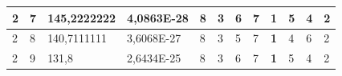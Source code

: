 \documentclass[conference]{IEEEtran}
\begin{document}
\begin{table}[]
\begin{tabular}{|llll|llllllll|}
\multicolumn{1}{|l|}{2}                                                              & \multicolumn{1}{l|}{7}                                                                 & \multicolumn{1}{l|}{145,2222222}                                                           & 4,0863E-28                              & \multicolumn{1}{l|}{8}                                                           & \multicolumn{1}{l|}{3}                                                           & \multicolumn{1}{l|}{6}                                                           & \multicolumn{1}{l|}{7}                                                           & \multicolumn{1}{l|}{\textbf{1}}                                                  & \multicolumn{1}{l|}{5}                                                           & \multicolumn{1}{l|}{4}                                                           & 2                                   \\ \hline
\multicolumn{1}{|l|}{2}                                                              & \multicolumn{1}{l|}{8}                                                                 & \multicolumn{1}{l|}{140,7111111}                                                           & 3,6068E-27                              & \multicolumn{1}{l|}{8}                                                           & \multicolumn{1}{l|}{3}                                                           & \multicolumn{1}{l|}{5}                                                           & \multicolumn{1}{l|}{7}                                                           & \multicolumn{1}{l|}{\textbf{1}}                                                  & \multicolumn{1}{l|}{4}                                                           & \multicolumn{1}{l|}{6}                                                           & 2                                   \\ \hline
\multicolumn{1}{|l|}{2}                                                              & \multicolumn{1}{l|}{9}                                                                 & \multicolumn{1}{l|}{131,8}                                                                 & 2,6434E-25                              & \multicolumn{1}{l|}{8}                                                           & \multicolumn{1}{l|}{3}                                                           & \multicolumn{1}{l|}{6}                                                           & \multicolumn{1}{l|}{7}                                                           & \multicolumn{1}{l|}{\textbf{1}}                                                  & \multicolumn{1}{l|}{5}                                                           & \multicolumn{1}{l|}{4}                                                           & 2                                   \\ \hline

\end{tabular}
\end{table}
\end{document}
